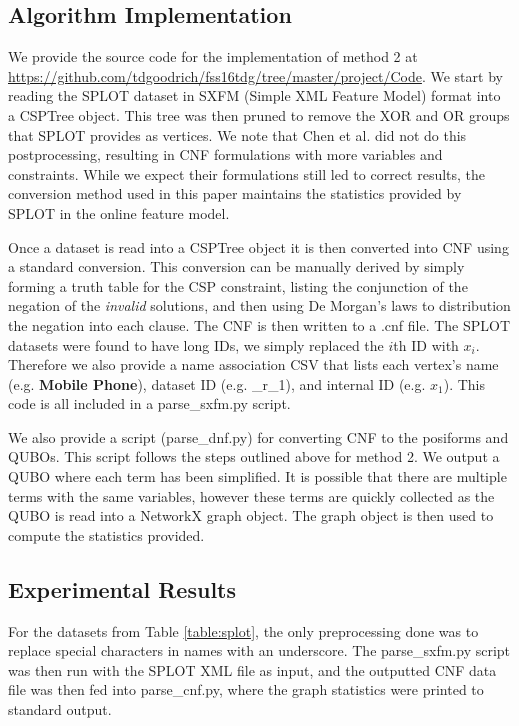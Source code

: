 \documentclass{sig-alternate-05-2015}
\begin{document}
\subsection{Algorithm Implementation}
We provide the source code for the implementation of method 2 at \url{https://github.com/tdgoodrich/fss16tdg/tree/master/project/Code}. We start by reading the SPLOT dataset in SXFM (Simple XML Feature Model) format into a CSPTree object. This tree was then pruned to remove the XOR and OR groups that SPLOT provides as vertices. We note that Chen et al. \cite{chen2016sampling} did not do this postprocessing, resulting in CNF formulations with more variables and constraints. While we expect their formulations still led to correct results, the conversion method used in this paper maintains the statistics provided by SPLOT in the online feature model.

Once a dataset is read into a CSPTree object it is then converted into CNF using a standard conversion. This conversion can be manually derived by simply forming a truth table for the CSP constraint, listing the conjunction of the negation of the \emph{invalid} solutions, and then using De Morgan's laws to distribution the negation into each clause. The CNF is then written to a .cnf file. The SPLOT datasets were found to have long IDs, we simply replaced the $i$th ID with $x_i$. Therefore we also provide a name association CSV that lists each vertex's name (e.g. \textbf{Mobile Phone}), dataset ID (e.g. \_r\_1), and internal ID (e.g. $x_1$). This code is all included in a parse\_sxfm.py script.

We also provide a script (parse\_dnf.py) for converting CNF to the posiforms and QUBOs. This script follows the steps outlined above for method 2. We output a QUBO where each term has been simplified. It is possible that there are multiple terms with the same variables, however these terms are quickly collected as the QUBO is read into a NetworkX graph object. The graph object is then used to compute the statistics provided.

\subsection{Experimental Results}
For the datasets from Table \ref{table:splot}, the only preprocessing done was to replace special characters in names with an underscore. The parse\_sxfm.py script was then run with the SPLOT XML file as input, and the outputted CNF data file was then fed into parse\_cnf.py, where the graph statistics were printed to standard output.
\end{document}
